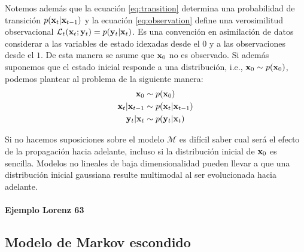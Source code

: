 Notemos además que la ecuación \ref{eq:transition} determina una probabilidad de transición $p(\mathbf{x}_t | \mathbf{x}_{t-1})$ y la ecuación \ref{eq:observation} define una verosimilitud observacional $\mathcal{L}_t(\mathbf{x}_t ; \mathbf{y}_t) = p(\mathbf{y}_t | \mathbf{x}_t)$. Es una convención en asimilación de datos considerar a las variables de estado idexadas desde el $0$ y a las observaciones desde el $1$. De esta manera se asume que $\mathbf{x}_0$ no es observado. Si además suponemos que el estado inicial responde a una distribución, i.e.,  $\mathbf{x}_0 \sim p(\mathbf{x}_0)$, podemos plantear al problema de la siguiente manera:
\begin{align}
    \mathbf{x}_0 &\sim p(\mathbf{x}_0) \\
    \mathbf{x}_t | \mathbf{x}_{t-1} &\sim p(\mathbf{x}_t | \mathbf{x}_{t-1}) \\
    \mathbf{y}_t | \mathbf{x}_t &\sim p(\mathbf{y}_t | \mathbf{x}_t)
\end{align}

Si no hacemos suposiciones sobre el modelo $\mathcal{M}$ es difícil saber cual será el efecto de la propagación hacia adelante, incluso si la distribución inicial de $\mathbf{x}_0$ es sencilla. Modelos no lineales de baja dimensionalidad pueden llevar a que una distribución inicial gaussiana resulte multimodal al ser evolucionada hacia adelante. 

\paragraph{Ejemplo Lorenz 63}

\subsection{Modelo de Markov escondido}

